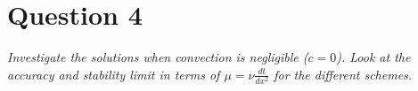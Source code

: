 \section*{Question 4}
\emph{Investigate the solutions when convection is negligible ($c = 0$). Look at the accuracy and stability limit in terms of $\mu = \nu \tfrac{dt}{dx^2}$ for the different schemes.}

